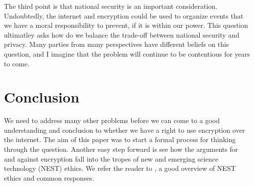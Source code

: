 \documentclass[11pt]{article}
\begin{document}
The third point is that national security is an important consideration.
Undoubtedly, the internet and encryption could be used to organize events that we have a moral responsibility to prevent, if it is within our power.
This question ultimatley asks how do we balance the trade-off between national security and privacy.
Many parties from many perspectives have different beliefs on this question, and I imagine that the problem will continue to be contentious for years to come. 




%

\section{Conclusion}
We need to address many other problems before we can come to a good understanding and conclusion to whether we have a right to use encryption over the internet.
The aim of this paper was to start a formal process for thinking through the question.
Another easy step forward is see how the arguments for and against encryption fall into the tropes of new and emerging science technology (NEST) ethics.
We refer the reader to \cite{nest}, a good overview of NEST ethics and common responses.

%
%
\end{document}
